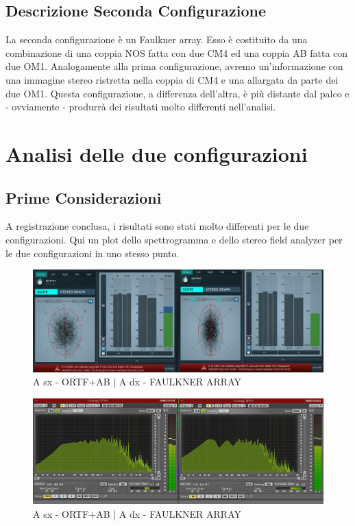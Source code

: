 \documentclass{article}
\begin{document}
        
    \subsection{Descrizione Seconda Configurazione}    
        La seconda configurazione è un Faulkner array. Esso è costituito da una combinazione di una coppia NOS fatta con due CM4 ed una coppia AB fatta con due OM1. Analogamente alla prima configurazione, avremo un'informazione con una immagine stereo ristretta nella coppia di CM4 e una allargata da parte dei due OM1. Questa configurazione, a differenza dell'altra, è più distante dal palco e - ovviamente - produrrà dei risultati molto differenti nell'analisi.
    
 

\section{Analisi delle due configurazioni}
    \subsection{Prime Considerazioni}
    A registrazione conclusa, i risultati sono stati molto differenti per le due configurazioni.
    Qui un plot dello spettrogramma e dello stereo field analyzer per le due configurazioni in uno stesso punto.
    
    \begin{figure}[H]
        \centering
        \includegraphics[width=1\textwidth]{images/1PLOT-STEREOSCOPE.png}
         \caption{\label{fig10}A sx - ORTF+AB | A dx - FAULKNER ARRAY}
    \end{figure}
    
    \begin{figure}[H]
        \centering
        \includegraphics[width=1\textwidth]{images/1PLOT-SPAN.png}
         \caption{\label{fig11}A sx - ORTF+AB | A dx - FAULKNER ARRAY}
    \end{figure}
    
\end{document}
